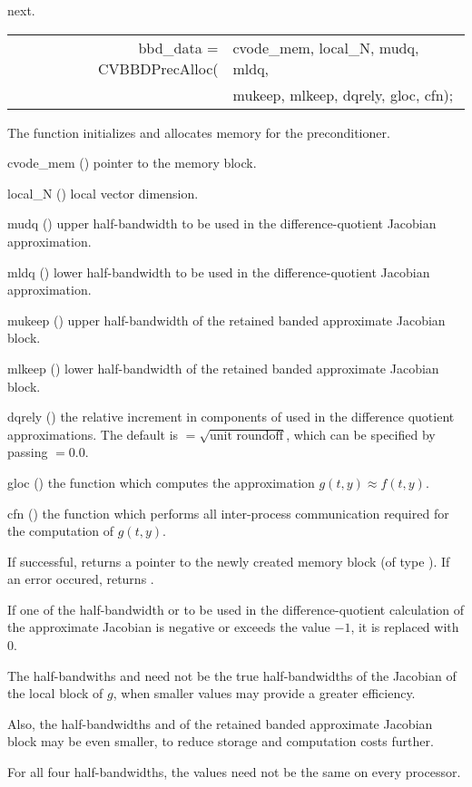 next.
{
   \begin{tabular}[t]{@{}r@{}l@{}}
     bbd\_data = CVBBDPrecAlloc(&cvode\_mem, local\_N, mudq, mldq, \\
                                &mukeep, mlkeep, dqrely, gloc, cfn);
   \end{tabular}
}
{
  The function  initializes and allocates
  memory for the {\cvbbdpre} preconditioner.
}
{
  \begin{args}
  \item[cvode\_mem] ()
    pointer to the {\cvode} memory block.
  \item[local\_N] ()
    local vector dimension.
  \item[mudq] ()
    upper half-bandwidth to be used in the difference-quotient Jacobian approximation.
  \item[mldq] ()
    lower half-bandwidth to be used in the difference-quotient Jacobian approximation.
  \item[mukeep] ()
    upper half-bandwidth of the retained banded approximate Jacobian block.
  \item[mlkeep] ()
    lower half-bandwidth of the retained banded approximate Jacobian block.
  \item[dqrely] ()
    the relative increment in components of  used in the difference quotient
    approximations.  The default is $ = \sqrt{\text{unit roundoff}}$, which
    can be specified by passing $ = 0.0$.
  \item[gloc] ()
    the {\C} function which computes the approximation $g(t,y) \approx f(t,y)$. 
  \item[cfn] ()
    the {\C} function which performs all inter-process communication required for
    the computation of $g(t,y)$.
  \end{args}
}
{
  If successful,  returns a pointer to the newly created 
  {\cvbbdpre} memory block (of type ).
  If an error occured,  returns .
}
{
  If one of the half-bandwidth  or  to be used in the 
  difference-quotient calculation of the approximate Jacobian is negative or 
  exceeds the value $-1$, it is replaced with 0.

  The half-bandwiths  and  need not be the true 
  half-bandwidths of the Jacobian of the local block of $g$,    
  when smaller values may provide a greater efficiency.       

  Also, the half-bandwidths  and  of the retained 
  banded approximate Jacobian block may be even smaller,      
  to reduce storage and computation costs further.            

  For all four half-bandwidths, the values need not be the    
  same on every processor.
}
